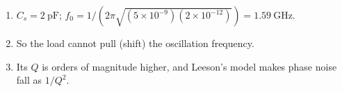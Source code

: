 \begin{enumerate}[leftmargin=1.6em,itemsep=2pt]
\item $C_s = 2\ \text{pF}$; $f_0 = 1/(2\pi\sqrt{(5\times10^{-9})(2\times10^{-12})}) = 1.59\ \text{GHz}$.
\item So the load cannot pull (shift) the oscillation frequency.
\item Its $Q$ is orders of magnitude higher, and Leeson's model makes phase noise fall as $1/Q^2$.
\end{enumerate}

